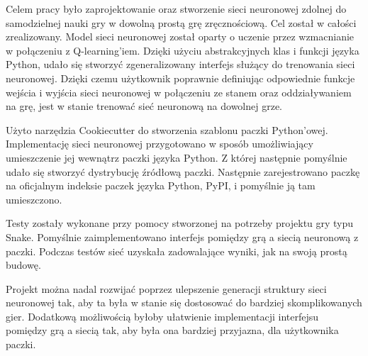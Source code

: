 Celem pracy było zaprojektowanie oraz stworzenie sieci neuronowej zdolnej do samodzielnej nauki gry w dowolną prostą grę zręcznościową. Cel został w całości zrealizowany. Model sieci neuronowej został oparty o uczenie przez wzmacnianie w połączeniu z Q-learning'iem. Dzięki użyciu abstrakcyjnych klas i funkcji języka Python, udało się stworzyć zgeneralizowany interfejs służący do trenowania sieci neuronowej. Dzięki czemu użytkownik poprawnie definiując odpowiednie funkcje wejścia i wyjścia sieci neuronowej w połączeniu ze stanem oraz oddziaływaniem na grę, jest w stanie trenować sieć neuronową na dowolnej grze.

Użyto narzędzia Cookiecutter do stworzenia szablonu paczki Python'owej. Implementację sieci neuronowej przygotowano w sposób umożliwiający umieszczenie jej wewnątrz paczki języka Python. Z której następnie pomyślnie udało się stworzyć dystrybucję źródłową paczki. Następnie zarejestrowano paczkę na oficjalnym indeksie paczek języka Python, PyPI, i pomyślnie ją tam umieszczono.

Testy zostały wykonane przy pomocy stworzonej na potrzeby projektu gry typu Snake. Pomyślnie zaimplementowano interfejs pomiędzy grą a siecią neuronową z paczki. Podczas testów sieć uzyskała zadowalające wyniki, jak na swoją prostą budowę.

Projekt można nadal rozwijać poprzez ulepszenie generacji struktury sieci neuronowej tak, aby ta była w stanie się dostosować do bardziej skomplikowanych gier. Dodatkową możliwością byłoby ułatwienie implementacji interfejsu pomiędzy grą a siecią tak, aby była ona bardziej przyjazna, dla użytkownika paczki.




